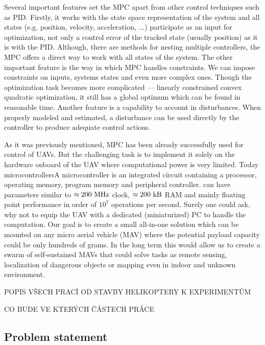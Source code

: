 Several important features set the MPC apart from other control techniques such as PID. Firstly, it works with the state space representation of the system and all states (e.g. position, velocity, acceleration, ...) participate as an input for optimization, not only a control error of the tracked state (usually position) as it is with the PID. Although, there are methods for nesting multiple controllers, the MPC offers a direct way to work with all states of the system. The other important feature is the way in which MPC handles constraints. We can impose constraints on inputs, systems states and even more complex ones. Though the optimization task becomes more complicated --- linearly constrained convex quadratic optimization, it still has a global optimum which can be found in reasonable time. Another feature is a capability to account in disturbances. When properly modeled and estimated, a disturbance can be used directly by the controller to produce adequate control actions.

As it was previously mentioned, MPC has been already successfully used for control of UAVs. But the challenging task is to implement it solely on the hardware onboard of the UAV where computational power is very limited. Today microcontrollers{A microcontroller is an integrated circuit containing a processor, operating memory, program memory and peripheral controller.} can have parameters similar to $\approx 200 ~\mathrm{MHz}$ clock, $\approx 200 ~\mathrm{kB}$ RAM and mainly floating point performance in order of $10^7$ operations per second. Surely one could ask, why not to equip the UAV with a dedicated (miniaturized) PC to handle the computation. Our goal is to create a small all-in-one solution which can be mounted on any micro aerial vehicle (MAV) where the potential payload capacity could be only hundreds of grams. In the long term this would allow us to create a swarm of self-sustained MAVs that could solve tasks as remote sensing, localization of dangerous objects or mapping even in indoor and unknown environment.

POPIS VŠECH PRACÍ OD STAVBY HELIKOPTERY K EXPERIMENTŮM

CO BUDE VE KTERÝCH ČÁSTECH PRÁCE

\subsection{Problem statement}

